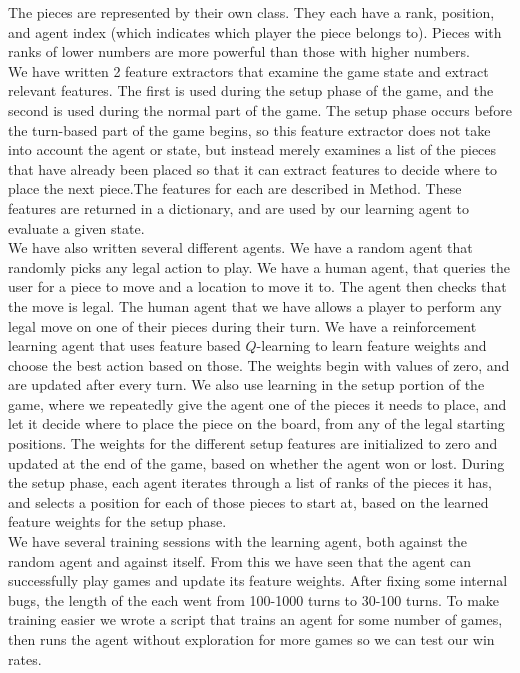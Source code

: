 \documentclass[letterpaper]{article}
\begin{document}
The pieces are represented by their own class. They each have a rank, position, and agent index (which indicates which player the piece belongs to). Pieces with ranks of lower numbers are more powerful than those with higher numbers. \\

We have written 2 feature extractors that examine the game state and extract relevant features. The first is used during 
the setup phase of the game, and the second is used during the normal part of the game. The setup phase occurs before the 
turn-based part of the game begins, so this feature extractor does not take into account the agent or state, but instead merely examines a list of the pieces that have already been placed so that it can extract features to decide where to place the next piece.The features for each are described
in Method. These features are returned in a dictionary, and are used by our learning agent to evaluate a given state.\\

We have also written several different agents. We have a random agent that randomly picks any legal action to play. We have a human agent, that queries the user for a piece to move and a location to move it to. The agent then checks that the move is legal. The human agent that we have allows a player to perform any legal move on one of their pieces during their turn. We have a reinforcement learning agent that uses feature based $Q$-learning to learn feature weights and choose the best action based on those. The weights begin with values of zero, and are updated after every turn. We also use learning in the setup portion of the game, where we repeatedly give the agent one of the pieces it needs to place, and let it decide where to place the piece on the board, from any of the legal starting positions. The weights for the different setup features are initialized to zero and updated at the end of the game, based on whether the agent won or lost. During the setup phase, each agent iterates through a list of ranks of the pieces it has, and selects a position for each of those pieces to start at, based on the learned feature weights for the setup phase.\\

We have several training sessions with the learning agent, both against the random agent and against itself. From this we have seen that the agent can successfully play games and update its feature weights. After fixing some internal bugs, the length of
the each went from 100-1000 turns to 30-100 turns. To make training easier we wrote a script that trains an agent for some
number of games, then runs the agent without exploration for more games so we can test our win rates. 
\end{document}
